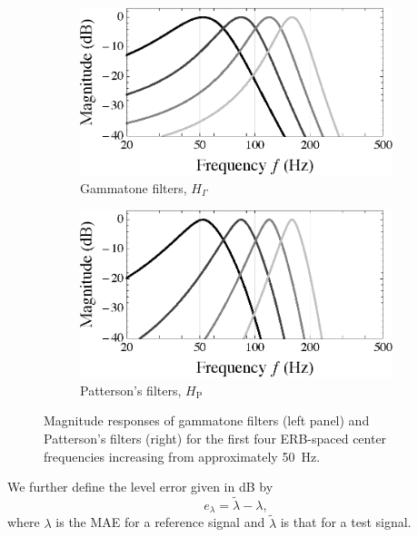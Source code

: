 \begin{figure}[t]
    	\centering
    	\begin{subfigure}[b]{0.49\textwidth}
        		\includegraphics[width=\textwidth]{04_auditory_models/figures/gammatone_mag.eps}
        		\caption{Gammatone filters, $H_\Gamma$}
        		\label{fig:04_Auditory_Models:Gammatone_Filters}
    	\end{subfigure}
	\hfill
    	\begin{subfigure}[b]{0.49\textwidth}
        		\includegraphics[width=\textwidth]{04_auditory_models/figures/patterson_mag.eps}
        		\caption{Patterson's filters, $H_\text{P}$}
        		\label{fig:04_Auditory_Models:Patterson_Filters}
    	\end{subfigure}
	
	\caption[Magnitude responses of gammatone filters and Patterson's filters.]{
	Magnitude responses of gammatone filters (left panel) and Patterson's filters (right) for the first four ERB-spaced center frequencies increasing from approximately 50~Hz.}
	\label{fig:04_Auditory_Models:Auditory_Filters}
\end{figure}

We further define the level error given in dB by
\begin{equation}\label{eq:04_Auditory_Models:Audible_Energy_Difference}
e_\lambda = \tilde{\lambda} - \lambda,
\end{equation}
where $\lambda$ is the MAE for a reference signal and $\tilde{\lambda}$ is that for a test signal.